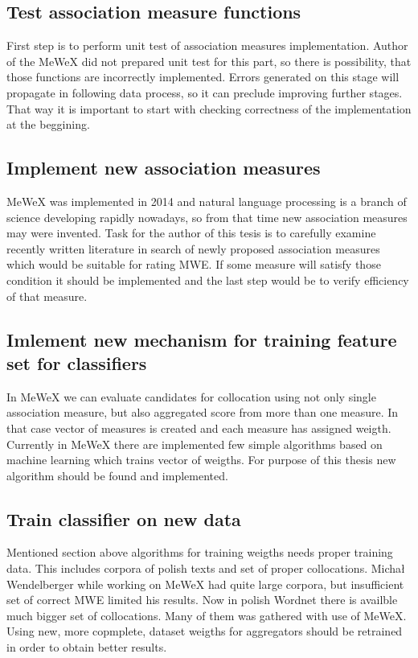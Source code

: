 \subsection{Test association measure functions}
First step is to perform unit test of association measures implementation. Author of the MeWeX did not prepared unit test for this part, 
so there is possibility, that those functions are incorrectly implemented. Errors generated on this stage will propagate in following data process, 
so it can preclude improving further stages. That way it is important to start with checking correctness of the implementation 
at the beggining.

\subsection{Implement new association measures}
MeWeX was implemented in 2014 and natural language processing is a branch of science developing rapidly nowadays, 
so from that time new association measures may were invented. Task for the author of this tesis is to carefully examine recently written literature 
in search of newly proposed association measures which would be suitable for rating MWE. If some measure will satisfy those condition it should 
be implemented and the last step would be to verify efficiency of that measure.

\subsection{Imlement new mechanism for training feature set for classifiers}
In MeWeX we can evaluate candidates for collocation using not only single association measure, but also aggregated score from more than one measure. 
In that case vector of measures is created and each measure has assigned weigth. Currently in MeWeX there are implemented few simple algorithms 
based on machine learning which trains vector of weigths. For purpose of this thesis new algorithm should be found and implemented.

\subsection{Train classifier on new data}
Mentioned section above algorithms for training weigths needs proper training data. This includes corpora of polish texts and set 
of proper collocations. Michał Wendelberger while working on MeWeX had quite large corpora, but insufficient set of correct MWE limited his results. 
Now in polish Wordnet there is availble much bigger set of collocations. Many of them was gathered with use of MeWeX.
Using new, more copmplete, dataset weigths for aggregators should be retrained in order to obtain better results.

